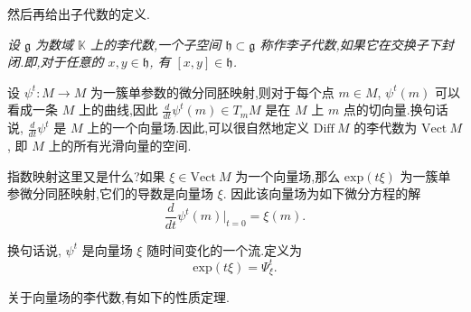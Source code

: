 然后再给出子代数的定义.
\begin{definition}
	\emph{设 $\mathfrak{g}$ 为数域 $\mathbb{K}$ 上的李代数,一个子空间 $\mathfrak{h}\subset \mathfrak{g}$ 称作李子代数,如果它在交换子下封闭.即,对于任意的 $x,y\in \mathfrak{h}$, 有 $[x,y]\in\mathfrak{h}$.}
\end{definition}

设 $\psi^t:M\to M$ 为一簇单参数的微分同胚映射,则对于每个点 $m\in M$, $\psi^t(m)$ 可以看成一条 $M$ 上的曲线,因此 $\frac{d}{dt}\psi^t(m)\in T_mM$ 是在 $M$ 上 $m$ 点的切向量.换句话说, $\frac{d}{dt}\psi^t$ 是 $M$ 上的一个向量场.因此,可以很自然地定义 $\mathrm{Diff}~M$ 的李代数为 $\mathrm{Vect}~M$, 即 $M$ 上的所有光滑向量的空间.

指数映射这里又是什么?如果 $\xi\in \mathrm{Vect}~M$ 为一个向量场,那么 $\mathrm{exp}(t\xi)$ 为一簇单参微分同胚映射,它们的导数是向量场 $\xi$. 因此该向量场为如下微分方程的解
\begin{equation*}
	\frac{d}{dt}\psi^t(m)|_{t=0}=\xi(m).
\end{equation*}

换句话说, $\psi^t$ 是向量场 $\xi$ 随时间变化的一个流.定义为
\begin{equation*}
	\mathrm{exp}(t\xi)=\Psi_{\xi}^t.
\end{equation*}

关于向量场的李代数,有如下的性质定理.

